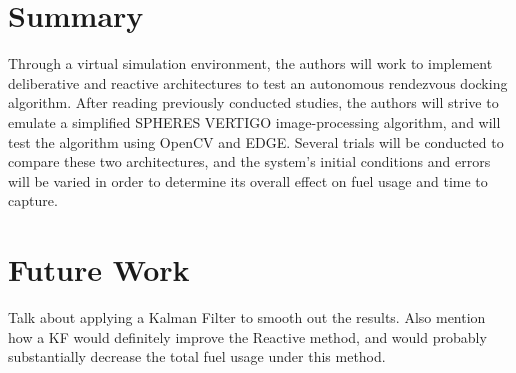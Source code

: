 \documentclass[journal, 10pt]{IEEEtran}
\begin{document}
\section{Summary}

Through a virtual simulation environment, the authors will work to implement deliberative and reactive architectures to test an autonomous rendezvous docking algorithm. After reading previously conducted studies, the authors will strive to emulate a simplified SPHERES VERTIGO image-processing algorithm, and will test the algorithm using OpenCV and EDGE. Several trials will be conducted to compare these two architectures, and the system's initial conditions and errors will be varied in order to determine its overall effect on fuel usage and time to capture.


\section{Future Work}
Talk about applying a Kalman Filter to smooth out the results. Also mention how a KF would definitely improve the Reactive method, and would probably substantially decrease the total fuel usage under this method.

\nocite{*}

{}
\end{document}
